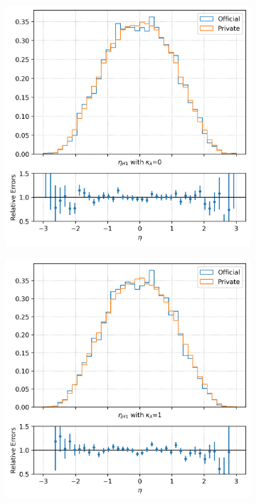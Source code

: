 \begin{figure}[h!]
    \centering
    \begin{subfigure}[b]{0.4\textwidth}
        \centering
        \includegraphics[width=\textwidth]{Images/4.HH4b Analysis/Validation plots/eta 0.png}
        \label{fig: kl0}
    \end{subfigure}
    \hfill
    \begin{subfigure}[b]{0.4\textwidth}
        \centering
        \includegraphics[width=\textwidth]{Images/4.HH4b Analysis/Validation plots/eta 1.png}
        \label{fig: kl1}
    \end{subfigure}


\end{figure}

